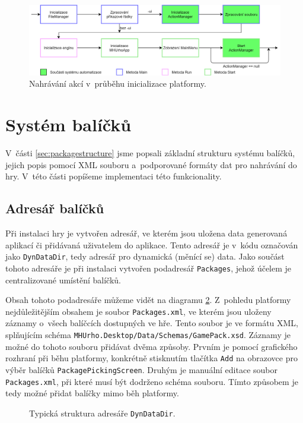 \begin{figure}[h]
	\centering
	\includegraphics[width=\textwidth]{img/MenuActions.png}
	\caption{Nahrávání akcí v~průběhu inicializace platformy.}
	\label{fig:uiautomationload}
\end{figure}

\section{Systém balíčků}
V~části \ref{sec:packagestructure} jsme popsali základní strukturu systému balíčků, jejich popis pomocí XML souboru a~podporované formáty dat pro nahrávání do hry. V~této části popíšeme implementaci této funkcionality.

\subsection{Adresář balíčků}
\label{sec:packagedir}
Při instalaci hry je vytvořen adresář, ve kterém jsou uložena data generovaná aplikací či přidávaná uživatelem do aplikace. Tento adresář je v~kódu označován jako \texttt{DynDataDir}, tedy adresář pro dynamická (měnící se) data. Jako součást tohoto adresáře je při instalaci vytvořen podadresář \texttt{Packages}, jehož účelem je centralizované umístění balíčků.

Obsah tohoto podadresáře můžeme vidět na diagramu \ref{fig:packagesdir}. Z~pohledu platformy nejdůležitějším obsahem je soubor \texttt{Packages.xml}, ve kterém jsou uloženy záznamy o~všech balíčcích dostupných ve hře. Tento soubor je ve formátu XML, splňujícím schéma \texttt{MHUrho.Desktop/Data/Schemas/GamePack.xsd}. Záznamy je možné do tohoto souboru přidávat dvěma způsoby. Prvním je pomocí grafického rozhraní při běhu platformy, konkrétně stisknutím tlačítka \texttt{Add} na obrazovce pro výběr balíčků \texttt{PackagePickingScreen}. Druhým je manuální editace soubor \texttt{Packages.xml}, při které musí být dodrženo schéma souboru. Tímto způsobem je tedy možné přidat balíčky mimo běh platformy. 

\begin{figure}[h]
	\centering
	\fontsize{6pt}{7pt}\selectfont
	\def\svgwidth{0.7\textwidth}
	
	\caption{Typická struktura adresáře \texttt{DynDataDir}.}
	\label{fig:packagesdir}
\end{figure}

